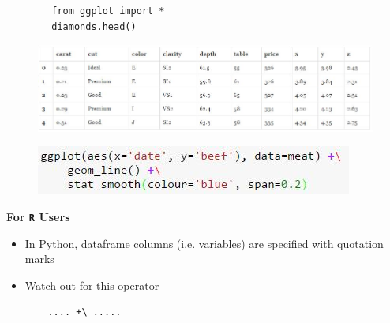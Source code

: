 \documentclass{beamer}
\begin{document}
\begin{frame}[fragile]
	\begin{framed}
		\begin{verbatim}
		from ggplot import *
		diamonds.head()
		\end{verbatim}
	\end{framed}
	\begin{figure}
		\centering
		\includegraphics[width=1.1\linewidth]{diamondsdata}
		
	\end{figure}
	
\end{frame}	
\begin{frame}[fragile]
	\Large

	\begin{figure}
\centering
\includegraphics[width=1.05\linewidth]{plusoperator}
\end{figure}
\end{frame}
\begin{frame}[fragile]
\Large
\noindent \textbf{For \texttt{R}  Users}
\begin{itemize}
	\item  In Python, dataframe columns (i.e. variables) are specified with quotation marks
\item Watch out for this operator
\begin{framed}
	\begin{verbatim}
	.... +\ .....
	\end{verbatim}
\end{framed}
\end{itemize}
\end{frame}
\end{document}
